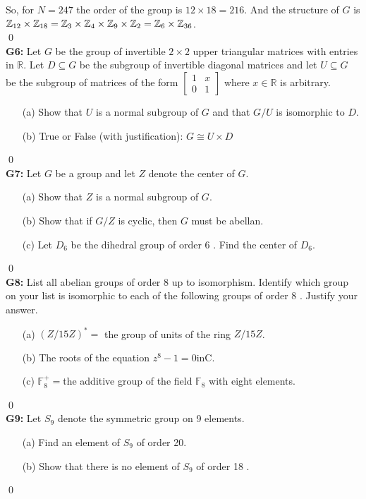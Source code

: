 So, for $ N=247 $ the order of the group is $ 12\times 18=216 $. And the structure of $ G $ is $ \mathbb{Z}_{12} \times \mathbb{Z}_{18}= \mathbb{Z}_{3}\times \mathbb{Z}_4 \times \mathbb{Z}_9 \times \mathbb{Z}_2 = \mathbb{Z}_{6}\times \mathbb{Z}_{36}$.\\
\qed\\
\textbf{G6:} Let $G$ be the group of invertible $2 \times 2$ upper triangular matrices with entries in $\mathbb{R}$. Let $D \subseteq G$ be the subgroup of invertible diagonal matrices and let $U \subseteq G$ be the subgroup of matrices of the form $\left[\begin{array}{ll}1 & x \\ 0 & 1\end{array}\right]$ where $x \in \mathbb{R}$ is arbitrary.
\begin{itemize}
	\item[(a)] Show that $U$ is a normal subgroup of $G$ and that $G / U$ is isomorphic to $D$.
	\item[(b)] True or False (with justification): $G \cong U \times D$
\end{itemize}
\soln

\qed\\
\textbf{G7:} Let $G$ be a group and let $Z$ denote the center of $G$.
\begin{itemize}
	\item[(a)] Show that $Z$ is a normal subgroup of $G$.
	\item[(b)] Show that if $G / Z$ is cyclic, then $G$ must be abellan.
	\item[(c)] Let $D_6$ be the dihedral group of order 6 . Find the center of $D_6$.
\end{itemize}
\soln
\qed\\

\textbf{G8:} List all abelian groups of order 8 up to isomorphism. Identify which group on your list is isomorphic to each of the following groups of order 8 . Justify your answer.
\begin{itemize}
	\item[(a)] $(Z / 15 Z)^*=$ the group of units of the ring $Z / 15 Z$.
	\item[(b)] The roots of the equation $z^8-1=0 \mathrm{in} \mathrm{C}$.
	\item[(c)] $\mathbb{F}_8^{+}=$the additive group of the field $\mathbb{F}_8$ with eight elements.
\end{itemize}
\soln
\qed\\
\textbf{G9:} Let $S_9$ denote the symmetric group on 9 elements.
\begin{itemize}
	\item[(a)] Find an element of $S_9$ of order 20.
	\item[(b)] Show that there is no element of $S_9$ of order 18 .
\end{itemize}
\soln
\qed\\

